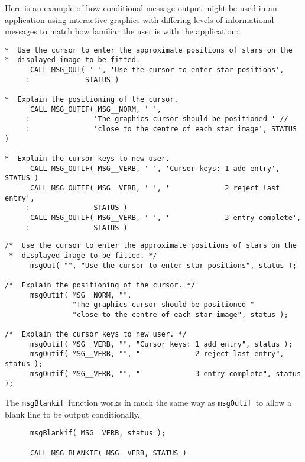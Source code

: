 \documentclass[twoside,11pt]{article}
\renewcommand{\_}{\texttt{\symbol{95}}}
\newcommand{\func}[1]{\texttt{#1}}
\newcommand{\msgblankif}{\func{msgBlankif}}
\newcommand{\msgoutif}{\func{msgOutif}}
\begin{document}
Here is an example of how conditional message output might be used
in an application using interactive graphics with differing levels of
informational messages to match how familiar the user is with the application:
\begin {small}
\begin{verbatim}
*  Use the cursor to enter the approximate positions of stars on the
*  displayed image to be fitted.
      CALL MSG_OUT( ' ', 'Use the cursor to enter star positions',
     :             STATUS )

*  Explain the positioning of the cursor.
      CALL MSG_OUTIF( MSG__NORM, ' ',
     :               'The graphics cursor should be positioned ' //
     :               'close to the centre of each star image', STATUS )

*  Explain the cursor keys to new user.
      CALL MSG_OUTIF( MSG__VERB, ' ', 'Cursor keys: 1 add entry', STATUS )
      CALL MSG_OUTIF( MSG__VERB, ' ', '             2 reject last entry',
     :               STATUS )
      CALL MSG_OUTIF( MSG__VERB, ' ', '             3 entry complete',
     :               STATUS )
\end{verbatim}
\end {small}
\begin {small}
\begin{verbatim}
/*  Use the cursor to enter the approximate positions of stars on the
 *  displayed image to be fitted. */
      msgOut( "", "Use the cursor to enter star positions", status );

/*  Explain the positioning of the cursor. */
      msgOutif( MSG__NORM, "",
                "The graphics cursor should be positioned "
                "close to the centre of each star image", status );

/*  Explain the cursor keys to new user. */
      msgOutif( MSG__VERB, "", "Cursor keys: 1 add entry", status );
      msgOutif( MSG__VERB, "", "             2 reject last entry", status );
      msgOutif( MSG__VERB, "", "             3 entry complete", status );
\end{verbatim}
\end {small}

The \msgblankif\ function works in much the same way as \msgoutif\ to
allow a blank line to be output conditionally.

\begin{small}
\begin{verbatim}
      msgBlankif( MSG__VERB, status );

      CALL MSG_BLANKIF( MSG__VERB, STATUS )
\end{verbatim}
\end{small}
\end{document}
